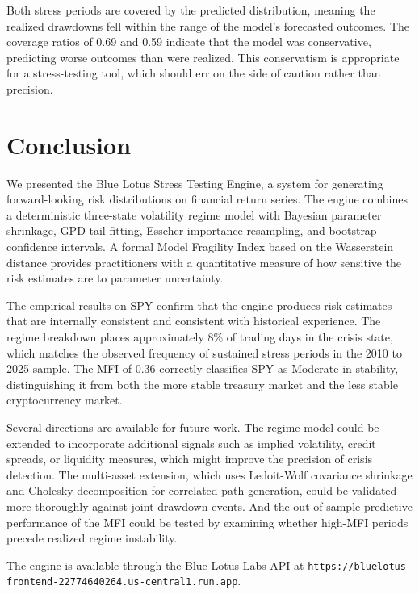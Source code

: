 \documentclass[12pt]{article}
\begin{document}
Both stress periods are covered by the predicted distribution, meaning the realized
drawdowns fell within the range of the model's forecasted outcomes. The coverage
ratios of 0.69 and 0.59 indicate that the model was conservative, predicting worse
outcomes than were realized. This conservatism is appropriate for a stress-testing
tool, which should err on the side of caution rather than precision.


\section{Conclusion}

We presented the Blue Lotus Stress Testing Engine, a system for generating forward-looking
risk distributions on financial return series. The engine combines a deterministic
three-state volatility regime model with Bayesian parameter shrinkage, GPD tail fitting,
Esscher importance resampling, and bootstrap confidence intervals. A formal Model
Fragility Index based on the Wasserstein distance provides practitioners with a
quantitative measure of how sensitive the risk estimates are to parameter uncertainty.

The empirical results on SPY confirm that the engine produces risk estimates that are
internally consistent and consistent with historical experience. The regime breakdown
places approximately 8\% of trading days in the crisis state, which matches the observed
frequency of sustained stress periods in the 2010 to 2025 sample. The MFI of 0.36
correctly classifies SPY as Moderate in stability, distinguishing it from both the
more stable treasury market and the less stable cryptocurrency market.

Several directions are available for future work. The regime model could be extended
to incorporate additional signals such as implied volatility, credit spreads, or
liquidity measures, which might improve the precision of crisis detection. The multi-asset
extension, which uses Ledoit-Wolf covariance shrinkage \citep{ledoitwolf2004} and
Cholesky decomposition for correlated path generation, could be validated more
thoroughly against joint drawdown events. And the out-of-sample predictive performance
of the MFI could be tested by examining whether high-MFI periods precede realized
regime instability.

The engine is available through the Blue Lotus Labs API at
\texttt{https://bluelotus-frontend-22774640264.us-central1.run.app}.
\end{document}

